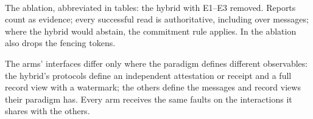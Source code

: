 \paragraph{} The ablation, abbreviated  in tables: the hybrid with E1--E3 removed. Reports count as evidence; every successful read is authoritative, including over messages; where the hybrid would abstain, the commitment rule applies. In  the ablation also drops the fencing tokens.

The arms' interfaces differ only where the paradigm defines different observables: the hybrid's protocols define an independent attestation or receipt and a full record view with a watermark; the others define the messages and record views their paradigm has. Every arm receives the same faults on the interactions it shares with the others.
